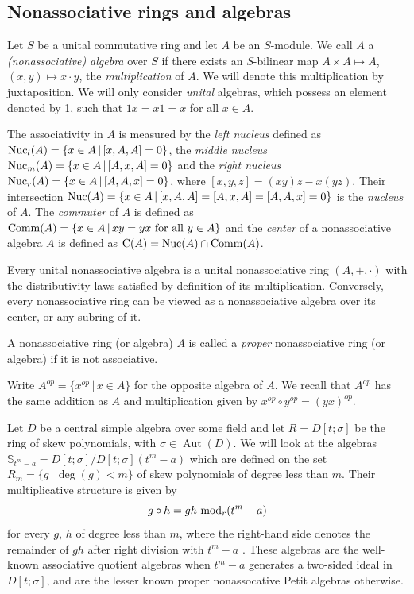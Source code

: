 \documentclass{amsart}
\theoremstyle{plain}
\theoremstyle{definition}
\numberwithin{equation}{section}
\numberwithin{figure}{section}
\DeclareMathOperator{\Aut}{Aut}
\begin{document}
\subsection{Nonassociative rings and algebras} \label{subsec:2}

Let $S$ be a unital commutative ring and let $A$ be an $S$-module.
We call $A$ a \emph{(nonassociative) algebra} over $S$ if there exists an $S$-bilinear
map $A\times A\mapsto A$, $(x,y) \mapsto x \cdot y$, the  \emph{multiplication} of $A$. We will  denote this multiplication by juxtaposition. We will only consider \emph{unital} algebras, which possess an element denoted by
1, such that $1x=x1=x$ for all $x\in A$.


  The associativity in $A$ is measured by the {\it left nucleus} defined as ${\rm Nuc}_l(A) = \{ x \in A \, \vert \, [x, A, A]
= 0 \}$, the {\it middle nucleus} ${\rm Nuc}_m(A) = \{ x \in A \,
\vert \, [A, x, A]  = 0 \}$ and  the {\it right nucleus}   ${\rm
Nuc}_r(A) = \{ x \in A \, \vert \, [A,A, x]  = 0 \}$, where $[x, y, z] = (xy) z - x (yz)$.
Their intersection
 ${\rm Nuc}(A) = \{ x \in A \, \vert \, [x, A, A] = [A, x, A] = [A,A, x] = 0 \}$ is the {\it nucleus} of $A$.
The  {\it commuter} of $A$ is defined as ${\rm
Comm}(A)=\{x\in A\,|\,xy=yx \text{ for all }y\in A\}$ and the {\it
center} of a nonassociative algebra $A$ is defined as ${\rm C}(A)=\text{Nuc}(A)\cap  {\rm Comm}(A)$.


Every unital nonassociative algebra is a unital nonassociative ring $(A,+,\cdot)$ with the distributivity laws satisfied by definition of its multiplication. Conversely, every nonassociative ring can be viewed as a nonassociative algebra over its center, or any subring of it.

 A nonassociative ring (or algebra) $A$  is called a \emph{proper} nonassociative ring (or algebra) if it is not associative.



Write $A^{op}=\{x^{op}\,|\, x\in A\}$ for the opposite algebra  of $A$. We recall that $A^{op}$ has the same addition as $A$ and multiplication given by
 $x^{op}\circ y^{op}=(yx)^{op}$.


Let $D$ be  a central simple algebra over some field and let $R=D[t;\sigma]$ be the ring of skew polynomials, with $\sigma\in \Aut(D)$. We will look at the algebras $ \mathbb{S}_{t^m-a}=D[t;\sigma]/D[t;\sigma](t^m-a)$ which are defined on the set $R_m=\{g\,|\, \deg (g)<m\}$ of skew polynomials of degree less than $m$.  Their multiplicative structure is given by
 $$g\circ h=gh \,\,{\rm mod}_r (t^m-a) $$
 for every $g$, $h$ of degree less than $m$,
 where the right-hand side denotes the remainder of $gh$ after right division with $t^m-a$ \cite{P66}. These algebras are the well-known associative quotient algebras when $t^m-a$ generates a two-sided ideal in $D[t;\sigma]$, and are the lesser known proper nonassocative Petit algebras otherwise.
 
\end{document}
